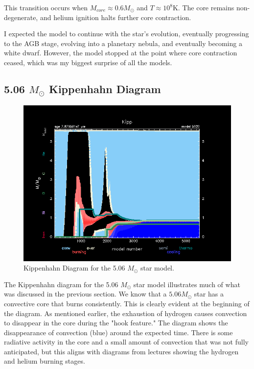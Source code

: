 \documentclass[fleqn,usenatbib]{mnras}
\begin{document}
\par This transition occurs when \(M_{core} \approx 0.6 M_\odot\) and \(T \approx 10^8 \text{K}\). The core remains non-degenerate, and helium ignition halts further core contraction.

\par I expected the model to continue with the star's evolution, eventually progressing to the AGB stage, evolving into a planetary nebula, and eventually becoming a white dwarf. However, the model stopped at the point where core contraction ceased, which was my biggest surprise of all the models.


\subsection{5.06 \(M_\odot\) Kippenhahn Diagram}

\begin{figure}

    \includegraphics[width=\columnwidth]{kipp_profile05520.png}
    \caption{Kippenhahn Diagram for the 5.06 \(M_\odot\) star model.}
    \label{fig:5.06_M_sun_kipp_figure}
\end{figure}

\par The Kippenhahn diagram for the 5.06 \(M_\odot\) star model illustrates much of what was discussed in the previous section. We know that a \(5.06 M_\odot\) star has a convective core that burns consistently. This is clearly evident at the beginning of the diagram. As mentioned earlier, the exhaustion of hydrogen causes convection to disappear in the core during the "hook feature." The diagram shows the disappearance of convection (blue) around the expected time. There is some radiative activity in the core and a small amount of convection that was not fully anticipated, but this aligns with diagrams from lectures showing the hydrogen and helium burning stages.
\end{document}
